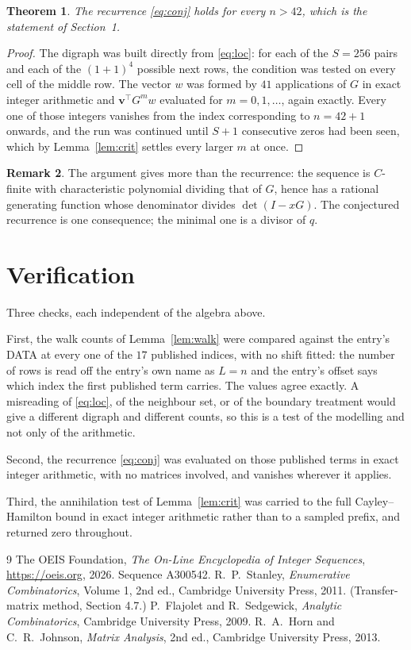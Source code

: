 \documentclass[11pt,a4paper]{article}
\theoremstyle{plain}
\newtheorem{theorem}{Theorem}
\theoremstyle{definition}
\newtheorem{remark}[theorem]{Remark}
\begin{document}
\begin{theorem}
The recurrence \eqref{eq:conj} holds for every $n>42$, which is the statement of
Section~1.
\end{theorem}

\begin{proof}
The digraph was built directly from \eqref{eq:loc}: for each of the $S=256$ pairs and each
of the $(1+1)^{4}$ possible next rows, the condition was tested on every cell of
the middle row. The vector $w$ was formed by $41$ applications of $G$ in exact integer
arithmetic and $\mathbf{v}^{\!\top}G^{m}w$ evaluated for $m=0,1,\dots$, again exactly.
Every one of those integers vanishes from the index corresponding to $n=42+1$ onwards,
and the run was continued until $S+1$ consecutive zeros had been seen, which by
Lemma~\ref{lem:crit} settles every larger $m$ at once.
\end{proof}

\begin{remark}
The argument gives more than the recurrence: the sequence is $C$-finite with characteristic
polynomial dividing that of $G$, hence has a rational generating function whose denominator
divides $\det(I-xG)$. The conjectured recurrence is one consequence; the minimal one is a
divisor of $q$.
\end{remark}

\section{Verification}

Three checks, each independent of the algebra above.

First, the walk counts of Lemma~\ref{lem:walk} were compared against the entry's DATA at
every one of the $17$ published indices, with no shift fitted: the number of rows is
read off the entry's own name as $L=n$ and the entry's offset says which index the first
published term carries. The values agree exactly. A misreading of \eqref{eq:loc}, of the
neighbour set, or of the boundary treatment would give a different digraph and different
counts, so this is a test of the modelling and not only of the arithmetic.

Second, the recurrence \eqref{eq:conj} was evaluated on those published terms in exact
integer arithmetic, with no matrices involved, and vanishes wherever it applies.

Third, the annihilation test of Lemma~\ref{lem:crit} was carried to the full
Cayley--Hamilton bound in exact integer arithmetic rather than to a sampled prefix, and
returned zero throughout.

\begin{thebibliography}{9}
 The OEIS Foundation, \emph{The On-Line Encyclopedia of Integer
Sequences}, \url{https://oeis.org}, 2026. Sequence A300542.
 R.~P.~Stanley, \emph{Enumerative Combinatorics}, Volume 1, 2nd ed.,
Cambridge University Press, 2011. (Transfer-matrix method, Section 4.7.)
 P.~Flajolet and R.~Sedgewick, \emph{Analytic Combinatorics}, Cambridge
University Press, 2009.
 R.~A.~Horn and C.~R.~Johnson, \emph{Matrix Analysis}, 2nd ed., Cambridge
University Press, 2013.
\end{thebibliography}
\end{document}
